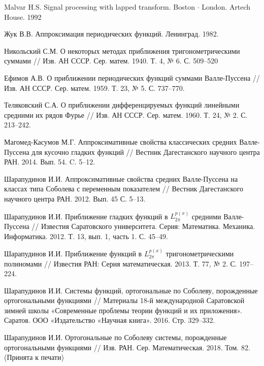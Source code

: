 \begin{thebibliography}{1} %



Malvar H.S. Signal processing with lapped transform. Boston{ $\cdot$} London. Artech House. 1992

 Жук В.В. Аппроксимация периодических функций. Ленинград. 1982.

 Никольский С.М. О некоторых методах приближения тригонометрическими суммами // Изв. АН СССР. Сер. матем. 1940. Т. 4, № 6. С. 509--520


 Ефимов А.В. О приближении периодических функций суммами Валле-Пуссена // Изв. АН СССР. Сер. матем. 1959. Т. 23, № 5. С. 737--770.

 Теляковский С.А. О приближении дифференцируемых функций линейными средними их рядов Фурье // Изв. АН СССР. Сер. матем. 1960. Т. 24, № 2. С. 213--242.

 Магомед-Касумов М.Г. Аппроксимативные свойства классических средних Валле-Пуссена для кусочно гладких функций // Вестник Дагестанского научного центра РАН. 2014. Вып. 54. C. 5--12.

 Шарапудинов И.И. Аппроксимативные свойства средних Валле-Пуссена на классах типа Соболева с переменным показателем // Вестник Дагестанского научного центра РАН. 2012. Вып. 45 С. 5--13.

 Шарапудинов И.И. Приближение гладких функций в $L_{2\pi}^{p(x)}$ средними Валле-Пуссена // Известия Саратовского университета. Серия: Математика. Механика. Информатика. 2012. Т. 13, вып. 1, часть 1. С. 45--49.

 Шарапудинов И.И. Приближение функций в $L^{p(x)}_{2\pi}$ тригонометрическими полиномами // Известия РАН: Серия математическая. 2013. Т. 77, № 2. С. 197--224.




{Шарапудинов И.И.}
Системы функций, ортогональные по Соболеву, порожденные ортогональными функциями // Материалы 18-й международной Саратовской зимней школы «Современные проблемы теории функций и их приложения». Саратов. ООО «Издательство «Научная книга». 2016. Стр. 329--332.

Шарапудинов И.И. Ортогональные  по Соболеву системы, порожденные ортогональными функциями // Изв. РАН. Сер. Математическая. 2018. Том. 82. (Принята к печати)


\end{thebibliography}
